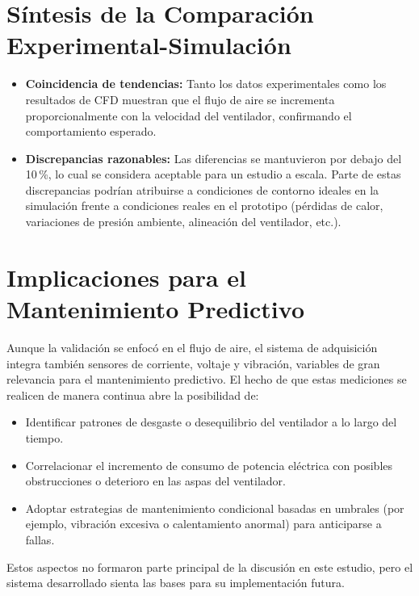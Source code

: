\section{Síntesis de la Comparación Experimental-Simulación}
\begin{itemize}
    \item \textbf{Coincidencia de tendencias:} Tanto los datos experimentales como los resultados de CFD muestran que el flujo de aire se incrementa proporcionalmente con la velocidad del ventilador, confirmando el comportamiento esperado.
    \item \textbf{Discrepancias razonables:} Las diferencias se mantuvieron por debajo del 10\,\%, lo cual se considera aceptable para un estudio a escala. Parte de estas discrepancias podrían atribuirse a condiciones de contorno ideales en la simulación frente a condiciones reales en el prototipo (pérdidas de calor, variaciones de presión ambiente, alineación del ventilador, etc.).
\end{itemize}

\section{Implicaciones para el Mantenimiento Predictivo}
Aunque la validación se enfocó en el flujo de aire, el sistema de adquisición integra también sensores de corriente, voltaje y vibración, variables de gran relevancia para el mantenimiento predictivo. El hecho de que estas mediciones se realicen de manera continua abre la posibilidad de:
\begin{itemize}
    \item Identificar patrones de desgaste o desequilibrio del ventilador a lo largo del tiempo.
    \item Correlacionar el incremento de consumo de potencia eléctrica con posibles obstrucciones o deterioro en las aspas del ventilador.
    \item Adoptar estrategias de mantenimiento condicional basadas en umbrales (por ejemplo, vibración excesiva o calentamiento anormal) para anticiparse a fallas.
\end{itemize}
Estos aspectos no formaron parte principal de la discusión en este estudio, pero el sistema desarrollado sienta las bases para su implementación futura.

